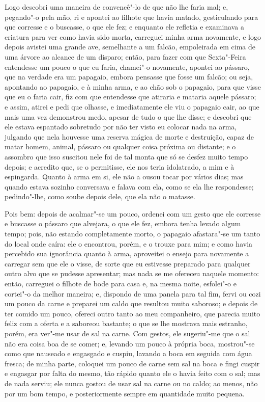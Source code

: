 Logo descobri uma maneira de convencê"-lo de que não lhe faria mal; e,
pegando"-o pela mão, ri e apontei ao filhote que havia matado,
gesticulando para que corresse e o buscasse, o que ele fez; e enquanto
ele refletia e examinava a criatura para ver como havia sido morta,
carreguei minha arma novamente, e logo depois avistei uma grande ave,
semelhante a um falcão, empoleirada em cima de uma árvore ao alcance de
um disparo; então, para fazer com que Sexta"-Feira entendesse um pouco o
que eu faria, chamei"-o novamente, apontei ao pássaro, que na verdade era
um papagaio, embora pensasse que fosse um falcão; ou seja, apontando ao
papagaio, e à minha arma, e ao chão sob o papagaio, para que visse que
eu o faria cair, fiz com que entendesse que atiraria e mataria aquele
pássaro; e assim, atirei e pedi que olhasse, e imediatamente ele viu o
papagaio cair, ao que mais uma vez demonstrou medo, apesar de tudo o que
lhe disse; e descobri que ele estava espantado sobretudo por não ter
visto eu colocar nada na arma, julgando que nela houvesse uma reserva
mágica de morte e destruição, capaz de matar homem, animal, pássaro ou
qualquer coisa próxima ou distante; e o assombro que isso suscitou nele
foi de tal monta que só se desfez muito tempo depois; e acredito que, se
o permitisse, ele nos teria idolatrado, a mim e à espingarda. Quanto à
arma em si, ele não a ousou tocar por vários dias; mas quando estava
sozinho conversava e falava com ela, como se ela lhe respondesse;
pedindo"-lhe, como soube depois dele, que ela não o matasse.

Pois bem: depois de acalmar"-se um pouco, ordenei com um gesto que ele
corresse e buscasse o pássaro que alvejara, o que ele fez, embora tenha
levado algum tempo; pois, não estando completamente morto, o papagaio
afastara"-se um tanto do local onde caíra: ele o encontrou, porém, e o
trouxe para mim; e como havia percebido sua ignorância quanto à arma,
aproveitei o ensejo para novamente a carregar sem que ele o visse, de
sorte que eu estivesse preparado para qualquer outro alvo que se pudesse
apresentar; mas nada se me ofereceu naquele momento: então, carreguei o
filhote de bode para casa e, na mesma noite, esfolei"-o e cortei"-o da
melhor maneira; e, dispondo de uma panela para tal fim, fervi ou cozi um
pouco da carne e preparei um caldo que resultou muito saboroso; e depois
de ter comido um pouco, ofereci outro tanto ao meu companheiro, que
parecia muito feliz com a oferta e a saboreou bastante; o que se lhe
mostrava mais estranho, porém, era ver"-me usar de sal na carne. Com
gestos, ele sugeriu"-me que o sal não era coisa boa de se comer; e,
levando um pouco à própria boca, mostrou"-se como que nauseado e
engasgado e cuspiu, lavando a boca em seguida com água fresca; de minha
parte, coloquei um pouco de carne sem sal na boca e fingi cuspir e
engasgar por falta do mesmo, tão rápido quanto ele o havia feito com o
sal; mas de nada serviu; ele nunca gostou de usar sal na carne ou no
caldo; ao menos, não por um bom tempo, e posteriormente sempre em
quantidade muito pequena.

